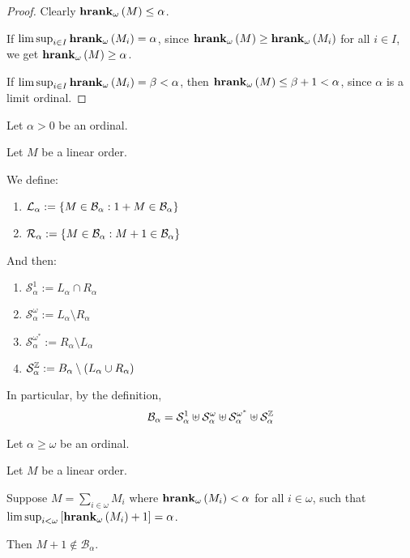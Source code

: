 \begin{proof}
  Clearly $\mathbf{hrank}_{\omega}\left( M \right) \le \alpha$.

  If $\limsup_{i \in I}{\mathbf{hrank}_{\omega}\left( M_i \right)} = \alpha$,
  since $\mathbf{hrank}_{\omega}\left( M \right) \ge \mathbf{hrank}_{\omega}\left( M_i \right)$ for all $i \in I$,
  we get $\mathbf{hrank}_{\omega}\left( M \right) \ge \alpha$.

  If $\limsup_{i \in I}{\mathbf{hrank}_{\omega}\left( M_i \right)} = \beta < \alpha$,
  then $\mathbf{hrank}_{\omega}\left( M \right) \le \beta + 1 < \alpha$, since
  $\alpha$ is a limit ordinal.
\end{proof}

\begin{definitions}
  Let $\alpha > 0$ be an ordinal.

  Let $M$ be a linear order.

  We define:
  \begin{enumerate}
    \item $\mathcal{L}_{\alpha} := \left\{ {M \in \mathcal{B}_{\alpha} : 1 + M \in \mathcal{B}_{\alpha}} \right\}$
    \item $\mathcal{R}_{\alpha} := \left\{ {M \in \mathcal{B}_{\alpha} : M + 1 \in \mathcal{B}_{\alpha}} \right\}$
  \end{enumerate}

  And then:
  \begin{enumerate}
    \item $\mathcal{S}^{1}_{\alpha} := L_{\alpha} \cap R_{\alpha}$
    \item $\mathcal{S}^{\omega}_{\alpha} := L_{\alpha} \setminus R_{\alpha}$
    \item $\mathcal{S}^{\omega^\ast}_{\alpha} := R_{\alpha} \setminus L_{\alpha}$
    \item $\mathcal{S}^{\mathbb{Z}}_{\alpha} := B_{\alpha} \setminus (L_{\alpha} \cup R_{\alpha})$
  \end{enumerate}

  In particular, by the definition,
  \[
    \mathcal{B}_{\alpha}
    = \mathcal{S}^{1}_{\alpha}
    \uplus \mathcal{S}^{\omega}_{\alpha}
    \uplus \mathcal{S}^{\omega^\ast}_{\alpha}
    \uplus \mathcal{S}^{\mathbb{Z}}_{\alpha}
  \]

\end{definitions}

\begin{lemma}
  Let $\alpha \ge \omega$ be an ordinal.

  Let $M$ be a linear order.

  Suppose $M = \sum_{i \in \omega} M_i$
  where $\mathbf{hrank}_{\omega}\left( M_i \right) < \alpha$ for all $i \in \omega$,
  such that $\limsup_{i < \omega} \left[ {\mathbf{hrank}_{\omega}\left( M_i \right) + 1} \right] = \alpha$.

  Then $M + 1 \notin \mathcal{B}_{\alpha}$.
\end{lemma}

